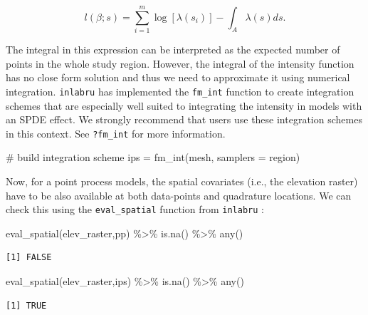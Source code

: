 \documentclass[
  letterpaper,
  DIV=11,
  numbers=noendperiod]{scrartcl}
\newenvironment{Shaded}{\begin{snugshade}}{\end{snugshade}}
\newcommand{\AttributeTok}[1]{\textcolor[rgb]{0.40,0.45,0.13}{#1}}
\newcommand{\CommentTok}[1]{\textcolor[rgb]{0.37,0.37,0.37}{#1}}
\newcommand{\FunctionTok}[1]{\textcolor[rgb]{0.28,0.35,0.67}{#1}}
\newcommand{\NormalTok}[1]{\textcolor[rgb]{0.00,0.23,0.31}{#1}}
\newcommand{\OtherTok}[1]{\textcolor[rgb]{0.00,0.23,0.31}{#1}}
\newcommand{\SpecialCharTok}[1]{\textcolor[rgb]{0.37,0.37,0.37}{#1}}
\begin{document}
\[
l(\beta;s) = \sum_{i=1}^m \log [\lambda(s_i)] - \int_A \lambda(s)ds.
\]

The integral in this expression can be interpreted as the expected
number of points in the whole study region. However, the integral of the
intensity function has no close form solution and thus we need to
approximate it using numerical integration. \texttt{inlabru} has
implemented the \texttt{fm\_int} function to create integration schemes
that are especially well suited to integrating the intensity in models
with an SPDE effect. We strongly recommend that users use these
integration schemes in this context. See \texttt{?fm\_int} for more
information.

\begin{Shaded}
\begin{Highlighting}[]
\CommentTok{\# build integration scheme}
\NormalTok{ips }\OtherTok{=} \FunctionTok{fm\_int}\NormalTok{(mesh,}
             \AttributeTok{samplers =}\NormalTok{ region)}
\end{Highlighting}
\end{Shaded}

Now, for a point process models, the spatial covariates (i.e., the
elevation raster) have to be also available at both data-points and
quadrature locations. We can check this using the \texttt{eval\_spatial}
function from \texttt{inlabru} :

\begin{Shaded}
\begin{Highlighting}[]
\FunctionTok{eval\_spatial}\NormalTok{(elev\_raster,pp) }\SpecialCharTok{\%\textgreater{}\%} \FunctionTok{is.na}\NormalTok{() }\SpecialCharTok{\%\textgreater{}\%} \FunctionTok{any}\NormalTok{()}
\end{Highlighting}
\end{Shaded}

\begin{verbatim}
[1] FALSE
\end{verbatim}

\begin{Shaded}
\begin{Highlighting}[]
\FunctionTok{eval\_spatial}\NormalTok{(elev\_raster,ips) }\SpecialCharTok{\%\textgreater{}\%} \FunctionTok{is.na}\NormalTok{() }\SpecialCharTok{\%\textgreater{}\%} \FunctionTok{any}\NormalTok{()}
\end{Highlighting}
\end{Shaded}

\begin{verbatim}
[1] TRUE
\end{verbatim}
\end{document}

